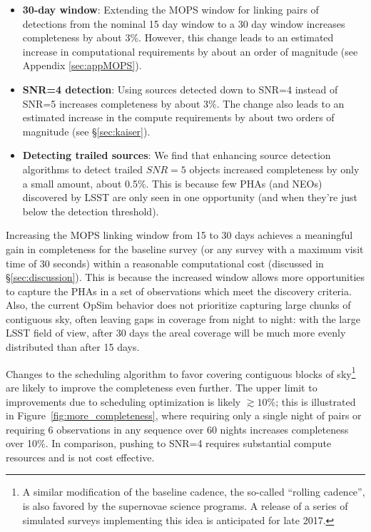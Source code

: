 \begin{itemize}
\item {\bf 30-day window}: Extending the MOPS window for linking pairs of detections from the nominal 15 day window to a 30 day window increases completeness by about 3\%. However, this change leads to an estimated increase in computational requirements by about an order of magnitude (see Appendix \ref{sec:appMOPS}).
\item {\bf SNR=4 detection}: Using sources detected down to SNR=4 instead of SNR=5 increases completeness by about 3\%. The change also leads to an estimated increase in the compute requirements by about two orders of magnitude (see \S\ref{sec:kaiser}).
\item {\bf Detecting trailed sources}: We find that enhancing source detection algorithms to detect trailed $SNR=5$ objects increased completeness by only a small amount, about 0.5\%. This is because few PHAs (and NEOs) discovered by LSST are only seen in one opportunity (and when they're just below the detection threshold).
\end{itemize}

Increasing the MOPS linking window from 15 to 30 days achieves a meaningful gain in completeness for the baseline survey (or any survey with a maximum visit time of 30 seconds) within a reasonable computational cost (discussed in \S\ref{sec:discussion}). This is because the increased window allows more opportunities to capture the PHAs in a set of observations which meet the discovery criteria. Also, the current OpSim behavior does not prioritize capturing large chunks of contiguous sky, often leaving gaps in coverage from night to night: with the large LSST field of view, after 30 days the areal coverage will be much more evenly distributed than after 15 days. 

Changes to the scheduling algorithm to favor covering contiguous blocks of sky\footnote{A similar modification of
the baseline cadence, the so-called ``rolling cadence'', is also favored by the supernovae science programs. A release of a series of simulated surveys implementing this idea is anticipated for late 2017.} are likely to improve the completeness even further. The upper limit to improvements due to scheduling optimization is likely $\gtrsim 10$\%; this is illustrated in Figure~\ref{fig:more_completeness}, where requiring only a single night of pairs or requiring 6 observations in any sequence over 60 nights increases completeness over 10\%. In comparison, pushing to SNR=4 requires substantial
compute resources and is not cost effective.


